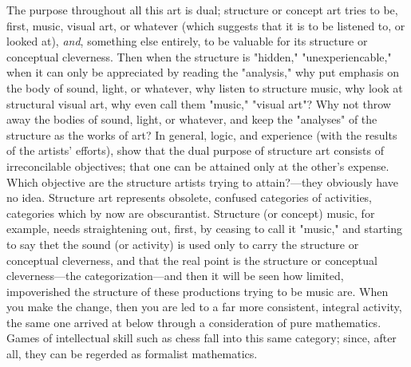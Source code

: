 The purpose throughout all this art is dual; structure or concept art tries to be, 
first, music, visual art, or whatever (which suggests that it is to be listened to, or 
looked at), \emph{and}, something else entirely, to be valuable for its structure or conceptual 
cleverness. Then when the structure is "hidden," "unexperiencable," when it can only be 
appreciated by reading the "analysis," why put emphasis on the body of sound, light, or 
whatever, why listen to structure music, why look at structural visual art, why even call 
them "music," "visual art"? Why not throw away the bodies of sound, light, or whatever, 
and keep the "analyses" of the structure as the works of art? In general, logic, and 
experience (with the results of the artists' efforts), show that the dual purpose of 
structure art consists of irreconcilable objectives; that one can be attained only at the 
other's expense. Which objective are the structure artists trying to attain?---they 
obviously have no idea. Structure art represents obsolete, confused categories of 
activities, categories which by now are obscurantist. Structure (or concept) music, 
for example, needs straightening out, first, by ceasing to call it "music," and starting 
to say thet the sound (or activity) is used only to carry the structure or conceptual 
cleverness, and that the real point is the structure or conceptual cleverness---the 
categorization---and then it will be seen how limited, impoverished the structure of 
these productions trying to be music are. When you make the change, then you are led 
to a far more consistent, integral activity, the same one arrived at below through 
a consideration of pure mathematics. Games of intellectual skill such as chess fall 
into this same category; since, after all, they can be regerded as formalist mathematics. 

